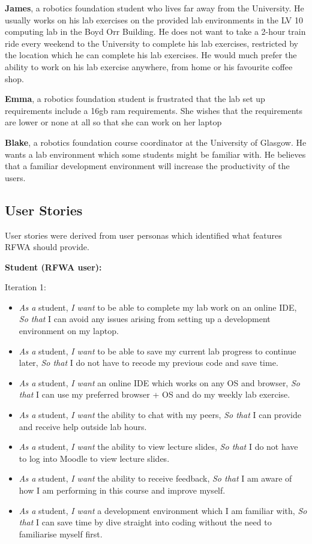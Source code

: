 \documentclass{l4proj}
\begin{document}
\textbf{James}, a robotics foundation student who lives far away from the University. He usually works on his lab exercises on the provided lab environments in the LV 10 computing lab in the Boyd Orr Building. He does not want to take a 2-hour train ride every weekend to the University to complete his lab exercises, restricted by the location which he can complete his lab exercises.  He would much prefer the ability to work on his lab exercise anywhere, from home or his favourite coffee shop.

\textbf{Emma}, a robotics foundation student is frustrated that the lab set up requirements include a 16gb ram requirements. She wishes that the requirements are lower or none at all so that she can work on her laptop

\textbf{Blake}, a robotics foundation course coordinator at the University of Glasgow. He wants a lab environment which some students might be familiar with. He believes that a familiar development environment will increase the productivity of the users.

\subsection{User Stories}
User stories were derived from user personas which identified what features RFWA should provide.

\textbf{Student (RFWA user):}

Iteration 1:

\begin{itemize}
    \item
    \emph{As a} student, \emph{I want} to be able to complete my lab work on an online IDE, \emph{So that} I can avoid any issues arising from setting up a development environment on my laptop.
    \item
    \emph{As a} student, \emph{I want} to be able to save my current lab progress to continue later, \emph{So that} I do not have to recode my previous code and save time.
    \item
    \emph{As a} student, \emph{I want} an online IDE which works on any OS and browser, \emph{So that} I can use my preferred browser + OS and do my weekly lab exercise.
    \item
    \emph{As a} student, \emph{I want} the ability to chat with my peers, \emph{So that} I can provide and receive help outside lab hours.
    \item
    \emph{As a} student, \emph{I want} the ability to view lecture slides, \emph{So that} I do not have to log into Moodle to view lecture slides.
    \item
    \emph{As a} student, \emph{I want} the ability to receive feedback, \emph{So that} I am aware of how I am performing in this course and improve myself.
    \item
    \emph{As a} student, \emph{I want} a development environment which I am familiar with, \emph{So that} I can save time by dive straight into coding without the need to familiarise myself first.
\end{itemize}
\end{document}
